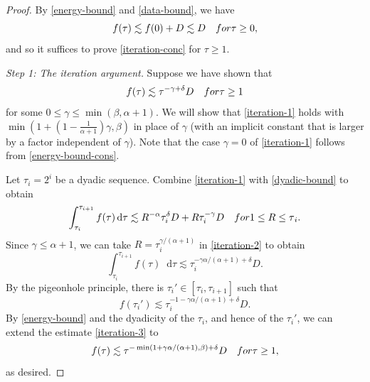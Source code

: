 \documentclass[10pt,a4paper]{amsart}
\newcommand{\dd}{\mathop{}\!\dletter}
\newcommand{\dletter}{\mathrm{d}}
\newcommand{\step}[1]{\smallskip\noindent\emph{#1}}
\begin{document}
\begin{proof}
By \cref{energy-bound} and \cref{data-bound}, we have
\begin{equation}\label{energy-bound-cons}
f(\tau{})\lesssim f(0) + D\lesssim D\quad \textnormal{for }\tau{}\ge 0,
\end{equation}
and so it suffices to prove \cref{iteration-conc} for \(\tau{}\ge 1\).

\step{Step 1: The iteration argument.} Suppose we
have shown that
\begin{equation}\label{iteration-1}
f(\tau{})\lesssim \tau^{-\gamma{}+\delta{}}D\quad \textnormal{for }\tau{}\ge 1
\end{equation}
for some \(0\le \gamma{}\le \min (\beta{},\alpha{}+1)\). We will show that \cref{iteration-1} holds with
\(\min (1 + (1-\frac{1}{\alpha{}+1})\gamma{},\beta{})\) in place of \(\gamma{}\)
(with an implicit constant that is larger by a factor independent of
\(\gamma{}\)). Note that the case \(\gamma{} = 0\) of \cref{iteration-1} follows
from \cref{energy-bound-cons}.

Let \(\tau_i=2^i\) be a dyadic sequence. Combine \cref{iteration-1} with
\cref{dyadic-bound} to obtain
\begin{equation}\label{iteration-2}
\int_{\tau_i}^{\tau_{i + 1}} f(\tau{})\dd{}\tau{}\lesssim R^{-\alpha{}}\tau_i^\delta{}D + R\tau_i^{-\gamma{}}D\quad \textnormal{for }1\le R\le \tau{}_i.
\end{equation}
Since \(\gamma{}\le \alpha{} + 1\), we can take \(R = \tau_i^{\gamma{}/(\alpha{}+1)}\) in \cref{iteration-2} to obtain
\begin{equation}
\int_{\tau_i}^{\tau_{i + 1}} f(\tau{})\dd{}\tau{}\lesssim \tau{}_i^{-\gamma{}\alpha{}/(\alpha{}+1)+\delta{}}D.
\end{equation}
By the pigeonhole principle, there is \(\tau_i'\in [\tau_i,\tau_{i + 1}]\) such that
\begin{equation}\label{iteration-3}
f(\tau{}_i')\lesssim \tau{}_i^{-1-\gamma{}\alpha{}/(\alpha{}+1)+\delta{}}D.
\end{equation}
By \cref{energy-bound} and the dyadicity of the \(\tau_i\), and hence of the \(\tau_i'\),
we can extend the estimate \cref{iteration-3} to
\begin{equation}\label{iteration-4}
f(\tau{})\lesssim \tau{}^{-\min (1+\gamma{}\alpha{}/(\alpha{}+1),\beta{})+\delta{}}D\quad \textnormal{for }\tau{}\ge 1,
\end{equation}
as desired.


\end{proof}
\end{document}
